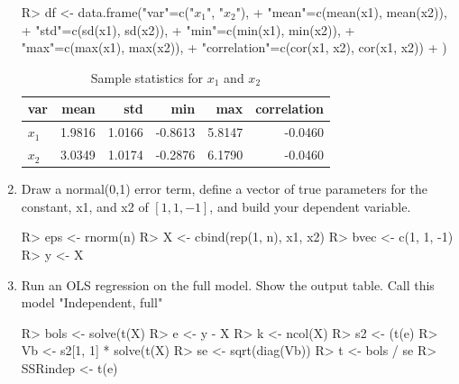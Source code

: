 \documentclass[11pt,reqno]{article}   %
\begin{document}
\begin{enumerate}
\begin{Schunk}
\begin{Sinput}
R> df <- data.frame("var"=c("$x_1$", "$x_2$"),
+                  "mean"=c(mean(x1), mean(x2)),
+                  "std"=c(sd(x1), sd(x2)),
+                  "min"=c(min(x1), min(x2)),
+                  "max"=c(max(x1), max(x2)),
+                  "correlation"=c(cor(x1, x2), cor(x1, x2))
+                  )
\end{Sinput}
\end{Schunk}

\begin{table}[!h]
\centering
\caption{Sample statistics for $x_1$ and $x_2$} 
\begin{tabular}{lrrrrr}
  \hline
var & mean & std & min & max & correlation \\ 
  \hline
$x_1$ & 1.9816 & 1.0166 & -0.8613 & 5.8147 & -0.0460 \\ 
  $x_2$ & 3.0349 & 1.0174 & -0.2876 & 6.1790 & -0.0460 \\ 
   \hline
\end{tabular}
\end{table}
\item Draw a normal(0,1) error term, define a vector of true parameters for the constant, x1, and x2 of
$\left[1,1,-1\right]$, and build your dependent variable.
\begin{Schunk}
\begin{Sinput}
R> eps <- rnorm(n)
R> X <- cbind(rep(1, n), x1, x2)
R> bvec <- c(1, 1, -1)
R> y <- X %
\end{Sinput}
\end{Schunk}

\item Run an OLS regression on the full model. Show the output table. Call this model "Independent, full"

\begin{Schunk}
\begin{Sinput}
R> bols <- solve(t(X) %
R> e <- y - X %
R> k <- ncol(X)
R> s2 <- (t(e) %
R> Vb <- s2[1, 1] * solve(t(X) %
R> se <- sqrt(diag(Vb))
R> t <- bols / se
R> SSRindep <- t(e) %
\end{Sinput}
\end{Schunk}


\end{enumerate}
\end{document}
